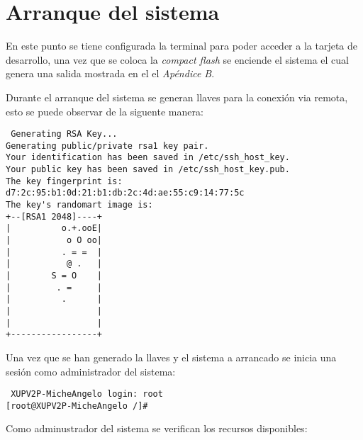 \section{Arranque del sistema}

En este punto se tiene configurada la terminal para poder acceder a la tarjeta
de desarrollo, una vez que se coloca la \emph{compact flash} se enciende el
sistema el cual genera una salida mostrada en el el \emph{Apéndice B}.

Durante el arranque del sistema se generan llaves para la conexión via remota,
esto se puede observar de la siguente manera:

\begin{verbatim}
 Generating RSA Key...
Generating public/private rsa1 key pair.
Your identification has been saved in /etc/ssh_host_key.
Your public key has been saved in /etc/ssh_host_key.pub.
The key fingerprint is:
d7:2c:95:b1:0d:21:b1:db:2c:4d:ae:55:c9:14:77:5c 
The key's randomart image is:
+--[RSA1 2048]----+
|          o.+.ooE|
|           o O oo|
|          . = =  |
|           @ .   |
|        S = O    |
|         . =     |
|          .      |
|                 |
|                 |
+-----------------+
\end{verbatim}

Una vez que se han generado la llaves y el sistema a arrancado se inicia una
sesión como administrador del sistema:

\begin{verbatim}
 XUPV2P-MicheAngelo login: root
[root@XUPV2P-MicheAngelo /]#
\end{verbatim}

Como adminustrador del sistema se verifican los recursos disponibles:

